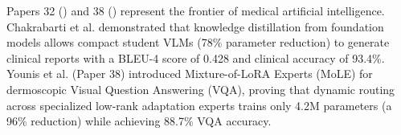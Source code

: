 Papers 32 (\cite{11091320}) and 38 (\cite{11626860}) represent the frontier of medical artificial intelligence. Chakrabarti et al. demonstrated that knowledge distillation from foundation models allows compact student VLMs (78\% parameter reduction) to generate clinical reports with a BLEU-4 score of 0.428 and clinical accuracy of 93.4\%. Younis et al. (Paper 38) introduced Mixture-of-LoRA Experts (MoLE) for dermoscopic Visual Question Answering (VQA), proving that dynamic routing across specialized low-rank adaptation experts trains only 4.2M parameters (a 96\% reduction) while achieving 88.7\% VQA accuracy.
